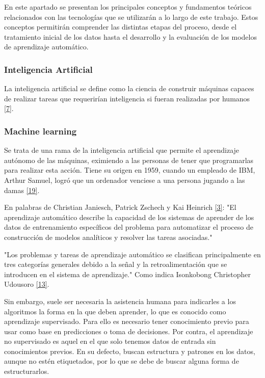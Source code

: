 \documentclass[11pt, a4paper]{article}
\numberwithin{equation}{section}
\begin{document}
En este apartado se presentan los principales conceptos y fundamentos teóricos relacionados con las tecnologías que se utilizarán a lo largo de este trabajo. Estos conceptos permitirán comprender las distintas etapas del proceso, desde el tratamiento inicial de los datos hasta el desarrollo y la evaluación de los modelos de aprendizaje automático.

\subsubsection{Inteligencia Artificial}

La inteligencia artificial se define como la ciencia de construir máquinas capaces de realizar tareas que requerirían inteligencia si fueran realizadas por humanos \hyperlink{ref:7}{[7]}.

\subsubsection{Machine learning}

Se trata de una rama de la inteligencia artificial que permite el aprendizaje autónomo de las máquinas, eximiendo a las personas de tener que programarlas para realizar esta acción. Tiene su origen en 1959, cuando un empleado de IBM, Arthur Samuel, logró que un ordenador venciese a una persona jugando a las damas \hyperlink{ref:19}{[19]}.

En palabras de Christian Janiesch, Patrick Zschech y Kai Heinrich \hyperlink{ref:3}{[3]}: "El aprendizaje automático describe la capacidad de los sistemas de aprender de los datos de entrenamiento específicos del problema para automatizar el proceso de construcción de modelos analíticos y resolver las tareas asociadas."

"Los problemas y tareas de aprendizaje automático se clasifican principalmente en tres categorías generales debido a la señal y la retroalimentación que se introducen en el sistema de aprendizaje." Como indica Isonkobong Christopher Udousoro \hyperlink{ref:13}{[13]}.

Sin embargo, suele ser necesaria la asistencia humana para indicarles a los algoritmos la forma en la que deben aprender, lo que es conocido como aprendizaje supervisado. Para ello es necesario tener conocimiento previo para usar como base en predicciones o toma de decisiones. Por contra, el aprendizaje no supervisado es aquel en el que solo tenemos datos de entrada sin conocimientos previos. En su defecto, buscan estructura y patrones en los datos, aunque no estén etiquetados, por lo que se debe de buscar alguna forma de estructurarlos.
\end{document}
